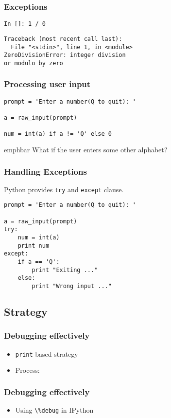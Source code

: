 \documentclass[compress,14pt]{beamer}
\newcommand{\emphbar}[1]
{\begin{beamercolorbox}[rounded=true]{emphbar} 
      {#1}
 \end{beamercolorbox}
}
\newcommand{\typ}[1]{\lstinline{#1}}
\begin{document}
\begin{frame}[fragile]
 \frametitle{Exceptions}
 \begin{lstlisting}
In []: 1 / 0
\end{lstlisting}
\pause
\begin{lstlisting}
Traceback (most recent call last):
  File "<stdin>", line 1, in <module>
ZeroDivisionError: integer division 
or modulo by zero
\end{lstlisting}
\end{frame}

\begin{frame}[fragile]
  \frametitle{Processing user input}
  \begin{lstlisting}
prompt = 'Enter a number(Q to quit): '

a = raw_input(prompt)

num = int(a) if a != 'Q' else 0
  \end{lstlisting}
  \emphbar{What if the user enters some other alphabet?}
\end{frame}


\begin{frame}[fragile]
  \frametitle{Handling Exceptions}
  Python provides \typ{try} and \typ{except} clause.
  \begin{lstlisting}
prompt = 'Enter a number(Q to quit): '

a = raw_input(prompt)
try:
    num = int(a)
    print num
except:
    if a == 'Q':
        print "Exiting ..."
    else:
        print "Wrong input ..."
  \end{lstlisting}  
\end{frame}

\subsection{Strategy}
\begin{frame}[fragile]
    \frametitle{Debugging effectively}
    \begin{itemize}
        \item \typ{print} based strategy
        \item Process:
    \end{itemize}
\begin{center}
\end{center}
\end{frame}

\begin{frame}[fragile]
    \frametitle{Debugging effectively}
    \begin{itemize}
      \item Using \typ{\%debug} in IPython
    \end{itemize}
\end{frame}
\end{document}

